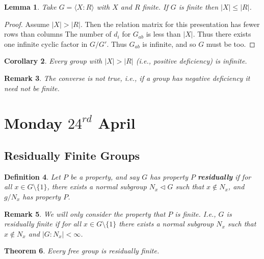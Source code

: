 \documentclass[a4paper,10pt]{article}
\newtheorem{thm}{Theorem}
\newtheorem{Def}[thm]{Definition}
\newtheorem{Cor}[thm]{Corollary}
\newtheorem{Lem}[thm]{Lemma}
\newtheorem{rem}[thm]{Remark}
\begin{document}
\begin{Lem}
Take $G = \langle X : R \rangle$ with $X$ and $R$ finite. If $G$ is finite then $|X| \leq |R|$. 
\end{Lem}

\begin{proof}
Assume $|X| > |R|$. Then the relation matrix for this presentation has fewer rows than columns The number of $d_i$ for $G_{ab}$ is less than $|X|$. Thus there exists one infinite cyclic factor in $G / G'$. Thus $G_{ab}$ is infinite, and so $G$ must be too. 
\end{proof}

\begin{Cor}
Every group with $|X| > |R|$ (i.e., positive deficiency) is infinite.
\end{Cor}

\begin{rem}
The converse is not true, i.e., if a group has negative deficiency it need not be finite.
\end{rem}




\newpage
\section{Monday $24^{rd}$ April}


\subsection{Residually Finite Groups}

\begin{Def}
Let $P$ be a property, and say $G$ has property $P$ \textbf{residually} if for all $x \in G \setminus \{1\}$, there exists a normal subgroup $N_x \triangleleft G$ such that $x \notin N_x$, and $g / N_x$ has property $P$. 
\end{Def}
\begin{rem}
We will only consider the property that $P$ is finite. I.e., $G$ is residually finite if for all $x \in G \setminus \{1\}$ there exists a normal subgroup $N_x$ such that $x \notin N_x$ and $|G : N_x| < \infty$. 
\end{rem}

\begin{thm}
Every free group is residually finite.
\end{thm}
\end{document}
